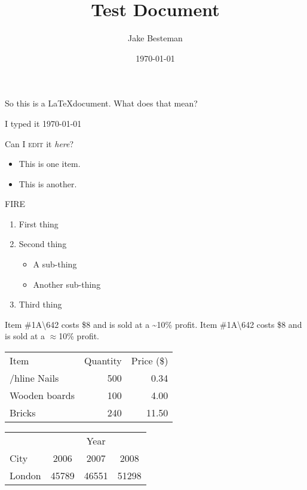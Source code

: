 \documentclass{article}
\begin{document}
\title{Test Document}
\author{Jake Besteman}
\date{\today}
\maketitle

\tableofcontents
\newpage
{}

So this is a \LaTeX document. What does that mean?

I typed it \today

Can I \textsc{edit} it \textit{here}?

\begin{itemize}
\item This is one item.
\item This is another.
\end{itemize}
{\color{red}FIRE}


\begin{enumerate}
\item First thing
\item Second thing
\begin{itemize}
\item A sub-thing
\item Another sub-thing
\end{itemize}
\item Third thing
\end{enumerate}

Item \#1A\textbackslash642 costs \$8 and is sold at a \~{}10\% profit.
Item \#1A\textbackslash642 costs \$8 and is sold at a $\approx$10\% profit.
\newline

\begin{tabular}{l|r|r}
Item & Quantity & Price (\$) \\
/hline
Nails & 500 & 0.34 \\
Wooden boards & 100 & 4.00 \\
Bricks & 240 & 11.50 \\
\end{tabular}
\newline

\begin{tabular}{l|ccc}
 & & Year & \\
\cline{2-4}
City & 2006 & 2007 & 2008 \\
\hline
London & 45789 & 46551 & 51298 \\
\end{tabular}
\end{document}

